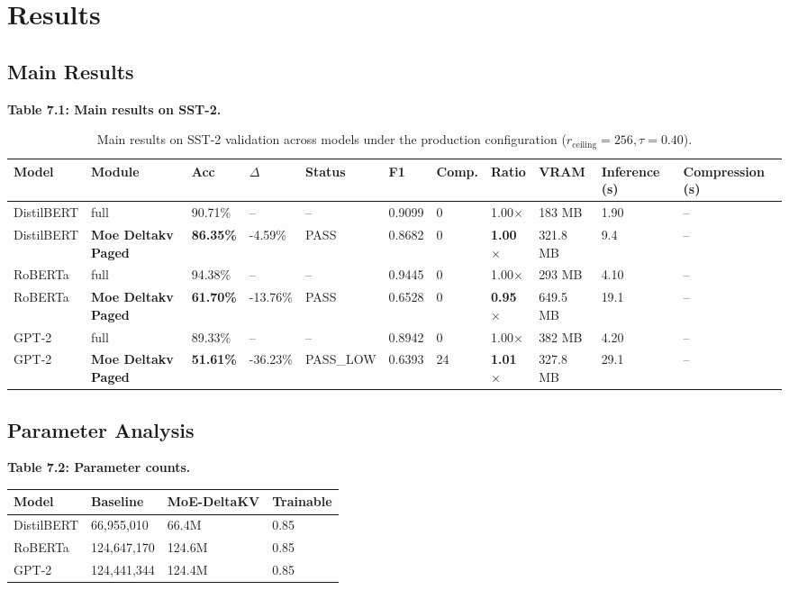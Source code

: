 \section{Results}

\subsection{Main Results}

\textbf{Table 7.1: Main results on SST-2.}

\begin{table}[t]
\centering
\small
\begin{tabular}{lllllllllll}
\toprule
\textbf{Model} & \textbf{Module} & \textbf{Acc} & \textbf{$\Delta$} & \textbf{Status} & \textbf{F1} & \textbf{Comp.} & \textbf{Ratio} & \textbf{VRAM} & \textbf{Inference (s)} & \textbf{Compression (s)} \\
\midrule
DistilBERT & full & 90.71\% & -- & -- & 0.9099 & 0 & 1.00$\times$ & 183 MB & 1.90 & -- \\
DistilBERT & \textbf{Moe Deltakv Paged} & \textbf{86.35\%} & -4.59\% & PASS & 0.8682 & 0 & \textbf{1.00$\times$} & 321.8 MB & 9.4 & -- \\
RoBERTa & full & 94.38\% & -- & -- & 0.9445 & 0 & 1.00$\times$ & 293 MB & 4.10 & -- \\
RoBERTa & \textbf{Moe Deltakv Paged} & \textbf{61.70\%} & -13.76\% & PASS & 0.6528 & 0 & \textbf{0.95$\times$} & 649.5 MB & 19.1 & -- \\
GPT-2 & full & 89.33\% & -- & -- & 0.8942 & 0 & 1.00$\times$ & 382 MB & 4.20 & -- \\
GPT-2 & \textbf{Moe Deltakv Paged} & \textbf{51.61\%} & -36.23\% & PASS\_LOW & 0.6393 & 24 & \textbf{1.01$\times$} & 327.8 MB & 29.1 & -- \\
\bottomrule
\end{tabular}
\caption{Main results on SST-2 validation across models under the production configuration ($r_{\mathrm{ceiling}}=256, \tau=0.40$).}
\label{tab:main_sst2}
\end{table}

\subsection{Parameter Analysis}

\textbf{Table 7.2: Parameter counts.}

\begin{table}[H]
\centering
\small
\begin{tabular}{llll}
\toprule
\textbf{Model} & \textbf{Baseline} & \textbf{MoE-DeltaKV} & \textbf{Trainable} \\
\midrule
DistilBERT & 66,955,010 & 66.4M & 0.85 \\
RoBERTa & 124,647,170 & 124.6M & 0.85 \\
GPT-2 & 124,441,344 & 124.4M & 0.85 \\
\bottomrule
\end{tabular}
\end{table}

